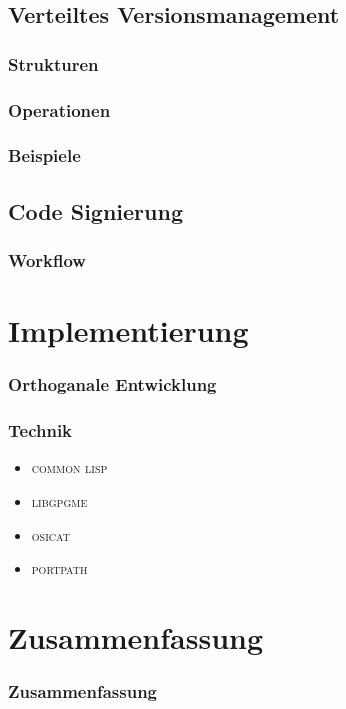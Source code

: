 \documentclass[german]{beamer}
\newcommand{\COMMONLISP}{\textsc{common lisp}}
\newcommand{\LIBGPGME}{\textsc{libgpgme}}
\newcommand{\OSICAT}{\textsc{osicat}}
\newcommand{\PORTPATH}{\textsc{portpath}}
\begin{document}
\subsection{Verteiltes Versionsmanagement}

\begin{frame}
  \frametitle{Strukturen}
  
\end{frame}

\begin{frame}
  \frametitle{Operationen}
  
\end{frame}

\begin{frame}
  \frametitle{Beispiele}

\end{frame}

\subsection{Code Signierung}

\begin{frame}
  \frametitle{Workflow}
  
\end{frame}

\section{Implementierung}

\begin{frame}
  \frametitle{Orthoganale Entwicklung}
  
\end{frame}

\begin{frame}
  \frametitle{Technik}
  \begin{itemize}
  \item \COMMONLISP{}
  \item \LIBGPGME{}
  \item \OSICAT{}
  \item \PORTPATH{}
  \end{itemize}
\end{frame}

\section{Zusammenfassung}

\begin{frame}
  \frametitle{Zusammenfassung}
  
\end{frame}
\end{document}

